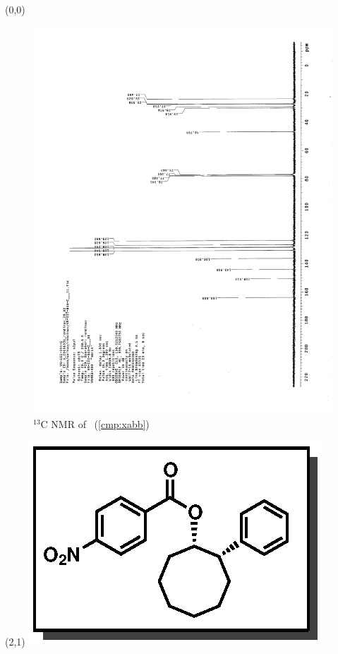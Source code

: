 \clearpage
\begin{textblock}{20}(0,0)
\begin{figure}[htb]
\caption{$^{13}$C NMR of  \CMPxabb\ (\ref{cmp:xabb})}
\includegraphics[scale=0.75, trim = 0mm 0mm 0mm 5mm,
clip]{chp_asymmetric/images/nmr/xabbC}
\vspace{-100pt}
\end{figure}
\end{textblock}
\begin{textblock}{1}(2,1)
\includegraphics[scale=0.8, angle=90]{chp_asymmetric/images/xabb}
\end{textblock}
\clearpage

